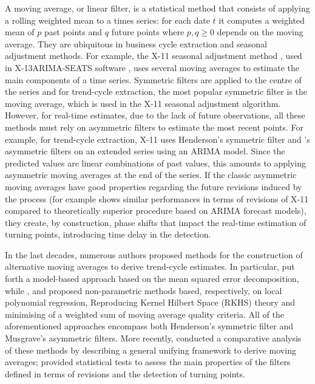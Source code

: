 \documentclass[
]{article}
\newcommand\1{\mathds{1}}
\begin{document}
A moving average, or linear filter, is a statistical method that
consists of applying a rolling weighted mean to a times series: for each
date \(t\) it computes a weighted mean of \(p\) past points and \(q\)
future points where \(p,q\geq0\) depends on the moving average. They are
ubiquitous in business cycle extraction and seasonal adjustment methods.
For example, the X-11 seasonal adjustment method
\autocite{ladiray2011seasonal}, used in X-13ARIMA-SEATS software
\autocite{x13}, uses several moving averages to estimate the main
components of a time series. Symmetric filters are applied to the centre
of the series and for trend-cycle extraction, the most popular symmetric
filter is the \textcite{henderson1916note} moving average, which is used
in the X-11 seasonal adjustment algorithm. However, for real-time
estimates, due to the lack of future observations, all these methods
must rely on asymmetric filters to estimate the most recent points. For
example, for trend-cycle extraction, X-11 uses Henderson's symmetric
filter and \textcite{musgrave1964set}'s asymmetric filters on an
extended series using an ARIMA model. Since the predicted values are
linear combinations of past values, this amounts to applying asymmetric
moving averages at the end of the series. If the classic asymmetric
moving averages have good properties regarding the future revisions
induced by the process (for example \textcite{pierce1980SA} shows
similar performances in terms of revisions of X-11 compared to
theoretically superior procedure based on ARIMA forecast models), they
create, by construction, phase shifts that impact the real-time
estimation of turning points, introducing time delay in the detection.

In the last decades, numerous authors proposed methods for the
construction of alternative moving averages to derive trend-cycle
estimates. In particular, \textcite{trilemmaWMR2019} put forth a
model-based approach based on the mean squared error decomposition,
while \textcite{proietti2008}, \textcite{dagumbianconcini2008} and
\textcite{ch15HBSA} proposed non-parametric methods based, respectively,
on local polynomial regression, Reproducing Kernel Hilbert Space (RKHS)
theory and minimising of a weighted sum of moving average quality
criteria. All of the aforementioned approaches encompass both
Henderson's symmetric filter and Musgrave's asymmetric filters. More
recently, \textcite{inseeDTM202401} conducted a comparative analysis of
these methods by describing a general unifying framework to derive
moving averages; \textcite{dagumBianconcini2023} provided statistical
tests to assess the main properties of the filters defined in terms of
revisions and the detection of turning points.
\end{document}
